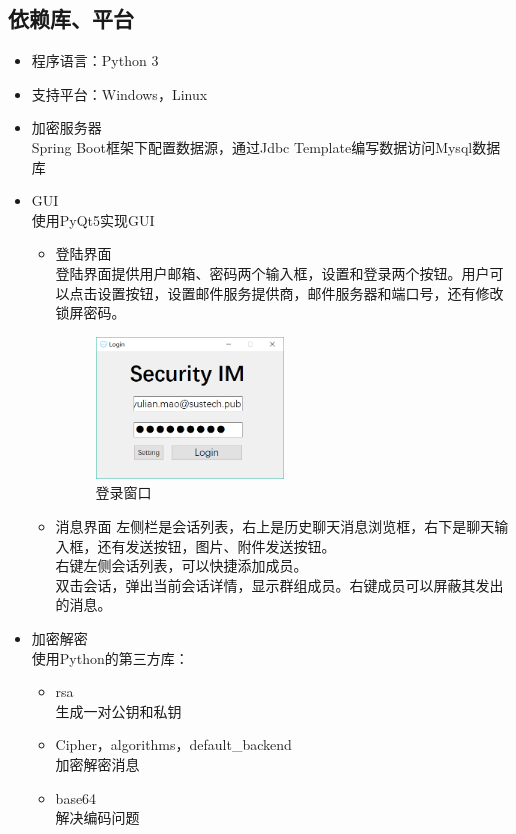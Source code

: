 \documentclass[a4paper,UTF8]{article}
\begin{document}
\subsection{依赖库、平台}
\begin{itemize}
	\item 程序语言：Python 3
	\item 支持平台：Windows，Linux
	\item 加密服务器\\
	Spring Boot框架下配置数据源，通过Jdbc Template编写数据访问Mysql数据库
	\item GUI\\
	使用PyQt5实现GUI
	\begin{itemize}
		\item 登陆界面\\
		登陆界面提供用户邮箱、密码两个输入框，设置和登录两个按钮。用户可以点击设置按钮，设置邮件服务提供商，邮件服务器和端口号，还有修改锁屏密码。
		\begin{figure}[H]
			\centering
			\includegraphics[width=0.5\textwidth]{UI2.png} 
			\caption{登录窗口}
			\label{fig:Log_in}
		\end{figure}
		\item 消息界面 
		左侧栏是会话列表，右上是历史聊天消息浏览框，右下是聊天输入框，还有发送按钮，图片、附件发送按钮。
		\\右键左侧会话列表，可以快捷添加成员。
		\\双击会话，弹出当前会话详情，显示群组成员。右键成员可以屏蔽其发出的消息。
	\end{itemize}
\item 加密解密\\
 使用Python的第三方库：
 \begin{itemize}
 	\item rsa\\
 	生成一对公钥和私钥
 	\item Cipher，algorithms，default\_backend\\
 	加密解密消息
 	\item base64\\
 	解决编码问题
 
 \end{itemize}
\end{itemize}
\end{document}
